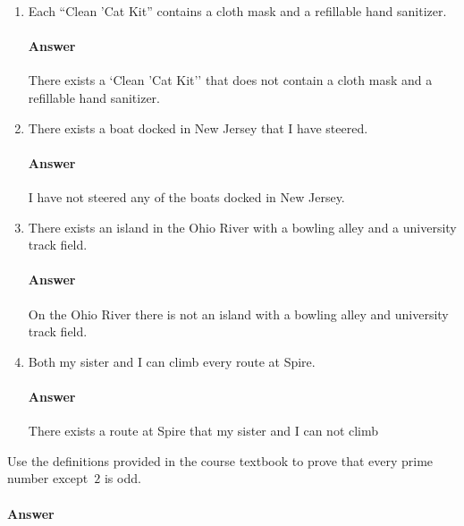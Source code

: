 \documentclass{article}
\begin{document}
\begin{enumerate}

    \item Each ``Clean 'Cat Kit''  contains a cloth mask and a refillable hand
        sanitizer.

        \paragraph{Answer}
        There exists a `Clean 'Cat Kit'' that does not contain a cloth mask
        and a refillable hand
        sanitizer.

    \item There exists a boat docked in New Jersey that I have steered.

        \paragraph{Answer}
        I have not steered any of the boats docked in New Jersey.

    \item There exists an island in the Ohio River with a bowling alley and a
        university track field.

        \paragraph{Answer}
        On the Ohio River there is not an island with a bowling alley and
        university track field.

    \item Both my sister and I can climb every route at Spire.

        \paragraph{Answer}
        There exists a route at Spire that my sister and I can not climb

\end{enumerate}

 
Use the definitions provided in the course textbook to prove that every prime
number except~$2$ is odd.

\paragraph{Answer}
\end{document}

